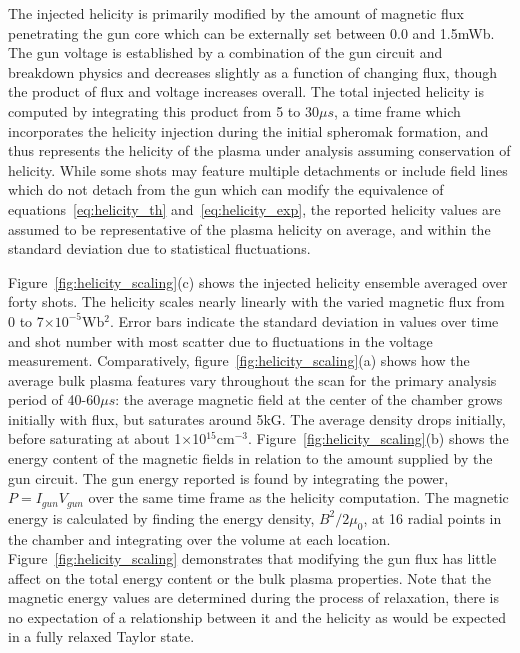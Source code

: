 \documentclass[aps,prl,amsmath,amssymb,reprint,superscriptaddress]{revtex4-1} %
\begin{document}
The injected helicity is primarily modified by the amount of magnetic flux penetrating the gun core which can be externally set between 0.0 and 1.5mWb. The gun voltage is established by a combination of the gun circuit and breakdown physics and decreases slightly as a function of changing flux, though the product of flux and voltage increases overall. The total injected helicity is computed by integrating this product from 5 to 30$\mu s$, a time frame which incorporates the helicity injection during the initial spheromak formation, and thus represents the helicity of the plasma under analysis assuming conservation of helicity. While some shots may feature multiple detachments or include field lines which do not detach from the gun which can modify the equivalence of equations~\ref{eq:helicity_th} and~\ref{eq:helicity_exp}, the reported helicity values are assumed to be representative of the plasma helicity on average, and within the standard deviation due to statistical fluctuations.


Figure~\ref{fig:helicity_scaling}(c) shows the injected helicity ensemble averaged over forty shots. The helicity scales nearly linearly with the varied magnetic flux from 0 to 7$\times 10^{-5}$Wb$^2$. Error bars indicate the standard deviation in values over time and shot number with most scatter due to fluctuations in the voltage measurement. Comparatively, figure~\ref{fig:helicity_scaling}(a) shows how the average bulk plasma features vary throughout the scan for the primary analysis period of 40-60$\mu s$: the average magnetic field at the center of the chamber grows initially with flux, but saturates around 5kG. The average density drops initially, before saturating at about 1$\times$10$^{15}$cm$^{-3}$. Figure~\ref{fig:helicity_scaling}(b) shows the energy content of the magnetic fields in relation to the amount supplied by the gun circuit. The gun energy reported is found by integrating the power, $P = I_{gun}V_{gun}$ over the same time frame as the helicity computation. The magnetic energy is calculated by finding the energy density, $B^{2}/2\mu_{0}$, at 16 radial points in the chamber and integrating over the volume at each location. Figure~\ref{fig:helicity_scaling} demonstrates that modifying the gun flux has little affect on the total energy content or the bulk plasma properties. Note that the magnetic energy values are determined during the process of relaxation, there is no expectation of a relationship between it and the helicity as would be expected in a fully relaxed Taylor state.
\end{document}
